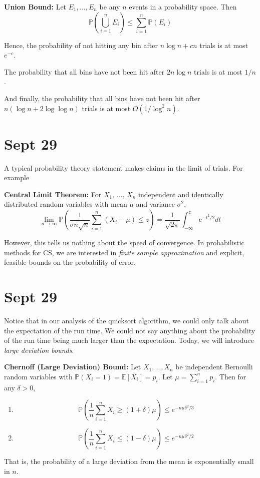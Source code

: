 \documentclass[12pt]{report}
\renewcommand{\P}{\mathbb{P}}
\newcommand{\E}{\mathbb{E}}
\newcommand*{\tbf}[1]{\ifmmode\mathbf{#1}\else\textbf{#1}\fi}
\newenvironment*{proposition}[1][gray]{
    \begin{tcolorbox}[
        parbox=false,
        colback=#1!5!white,
        colframe=#1!75!black,
        breakable
    ]}
    {\end{tcolorbox}}
\begin{document}
\tbf{Union Bound:} Let $E_1, \dots, E_n$ be any $n$ events in a probability space. Then
\[\P\left(\bigcup_{i=1}^n E_i\right) \leq \sum_{i=1}^n \P(E_i)\]

Hence, the probability of not hitting any bin after $n \log n + cn$ trials is at most $e^{-c}$. 

The probability that all bins have not been hit after $2n \log n$ trials is at most $1/n$.

And finally, the probability that all bins have not been hit after $n(\log n + 2\log \log n)$ trials is at most $O(1/\log^2 n)$.

\section{Sept 29}

A typical probability theory statement makes claims in the limit of trials. For example 
\begin{proposition}
    \textbf{Central Limit Theorem:} For $X_1,\, \dots,\, X_n$ independent and identically distributed random variables with mean $\mu$ and variance $\sigma^2$,
    \[\lim_{n \to \infty} \P(\frac{1}{\sigma n\sqrt n} \sum_{i=1}^n (X_i - \mu) \leq z) = \frac{1}{\sqrt{2\pi}} \int_{-\infty}^z e^{-t^2/2} dt\] 
\end{proposition}

However, this tells us nothing about the speed of convergence. In probabilistic methods for CS, we are interested in \emph{finite sample approximation} and explicit, feasible bounds on the probability of error.

\section{Sept 29}

Notice that in our analysis of the quicksort algorithm, we could only talk about the expectation of the run time. We could not say anything about the probability of the run time being much larger than the expectation. Today, we will introduce \emph{large deviation bounds}.

\begin{proposition}
    \textbf{Chernoff (Large Deviation) Bound:} Let $X_1, \dots, X_n$ be independent Bernoulli random variables with $\P(X_i = 1) = \E[X_i] = p_i$. Let $\mu = \sum_{i=1}^n p_i$. Then for any $\delta > 0$,
    \begin{enumerate}
        \item \[\P\left(\frac{1}{n} \sum_{i=1}^n X_i \geq( 1 + \delta)\mu\right) \leq e^{-n\mu \delta^2/3}\]
        \item \[\P\left(\frac{1}{n} \sum_{i=1}^n X_i \leq( 1 - \delta)\mu\right) \leq e^{-n\mu \delta^2/2}\]
    \end{enumerate}
    That is, the probability of a large deviation from the mean is exponentially small in $n$.
\end{proposition}
\end{document}
